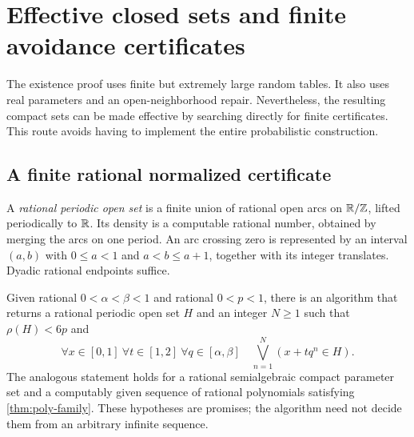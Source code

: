 \section{Effective closed sets and finite avoidance certificates}
\label{sec:effective}

The existence proof uses finite but extremely large random tables.
It also uses real parameters and an open-neighborhood repair.
Nevertheless, the resulting compact sets can be made effective by
searching directly for finite certificates. This route avoids having
to implement the entire probabilistic construction.

\subsection{A finite rational normalized certificate}

A \emph{rational periodic open set} is a finite union of rational open
arcs on $\mathbb R/\mathbb Z$, lifted periodically to $\mathbb R$. Its density is a
computable rational number, obtained by merging the arcs on one period.
An arc crossing zero is represented by an interval $(a,b)$ with
$0\le a<1$ and $a<b\le a+1$, together with its integer translates.
Dyadic rational endpoints suffice.

\begin{proposition}\label{prop:effective-H}
Given rational $0<\alpha<\beta<1$ and rational $0<p<1$, there is an algorithm
that returns a rational periodic open set $H$ and an integer $N\ge1$
such that $\rho(H)<6p$ and
\begin{equation}\label{eq:finite-H}
 \forall x\in[0,1]\ \forall t\in[1,2]\ \forall q\in[\alpha,\beta]
 \quad \bigvee_{n=1}^{N}(x+tq^n\in H).
\end{equation}
The analogous statement holds for a rational semialgebraic compact
parameter set and a computably given sequence of rational polynomials
satisfying \cref{thm:poly-family}. These hypotheses are promises;
the algorithm need not decide them from an arbitrary infinite sequence.
\end{proposition}

